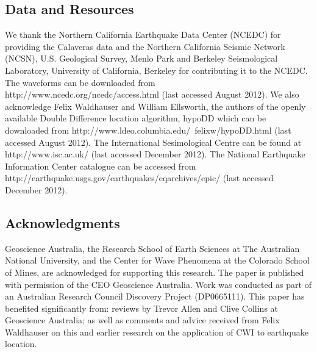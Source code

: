\documentclass[12pt,double]{article}
\begin{document}
\vspace{2em}
\begin{centering}
\section*{Data and Resources}
\end{centering}
We thank the Northern California Earthquake Data Center (NCEDC) for
providing the Calaveras data and the Northern California Seismic
Network (NCSN), U.S. Geological Survey, Menlo Park and Berkeley
Seismological Laboratory, University of California, Berkeley for
contributing it to the NCEDC. The waveforms can be downloaded from
http://www.ncedc.org/ncedc/access.html (last accessed August 2012). 
We also acknowledge Felix
Waldhauser and William Ellsworth, the authors of the openly
available Double Difference location algorithm, hypoDD which can be
downloaded from http://www.ldeo.columbia.edu/~felixw/hypoDD.html
(last accessed August 2012).
The International Sesimological Centre can be found at 
http://www.isc.ac.uk/ (last accessed December 2012).
The National Earthquake
Information
Center catalogue can be accessed from \\
http://earthquake.usgs.gov/earthquakes/eqarchives/epic/
(last accessed December 2012).

\vspace{2em}
\begin{centering}
\section*{Acknowledgments}
\end{centering}

Geoscience Australia, the Research School of Earth Sciences at The
Australian National University, and the Center for Wave Phenomena at
the Colorado School of Mines, are acknowledged for supporting this
research. The paper is published with permission of the CEO
Geoscience Australia. Work was conducted as part of an Australian
Research Council Discovery Project (DP0665111).  This paper has
benefited significantly from: reviews by Trevor Allen and Clive Collins
at Geoscience Australia; as well as comments and advice received from
Felix Waldhauser on this and earlier research on the application of
CWI to earthquake location.

\vspace{2em}
\end{document}
